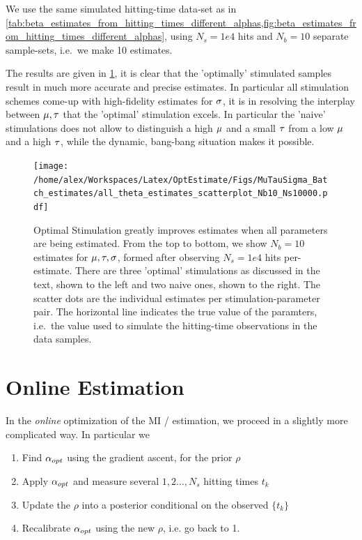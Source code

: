 We use the same simulated hitting-time data-set as in
\cref{tab:beta_estimates_from_hitting_times_different_alphas,fig:beta_estimates_from_hitting_times_different_alphas},
using $N_s=1e4$ hits and $N_b=10$ separate sample-sets, i.e.\ we make 10
estimates.

The results are given in \cref{fig:all_theta_estimates_batch}, it is clear that
the 'optimally' stimulated samples result in much more accurate and precise
estimates. In particular all stimulation schemes come-up with high-fidelity
estimates for $\sigma$, it is in resolving the interplay between ${\mu },{ \tau }$ that the
'optimal' stimulation excels. In particular the 'naive' stimulations does
not allow to distinguish a high ${\mu }$ and a small ${ \tau }$ from a low ${\mu }$
and a high ${ \tau }$, while the dynamic, bang-bang situation makes it possible.

\begin{figure}[htp]
\begin{center}
  \texttt{[image: /home/alex/Workspaces/Latex/OptEstimate/Figs/MuTauSigma\_Batch\_estimates/all\_theta\_estimates\_scatterplot\_Nb10\_Ns10000.pdf]}
  \caption[Batch estimates for all 3 parameters]{Optimal Stimulation greatly
  improves estimates when all parameters are being estimated. 
  From the top to bottom, we show $N_b=10$ estimates for ${\mu },{ \tau },\sigma$,
  formed after observing $N_s=1e4$ hits per-estimate. There are three 'optimal'
  stimulations as discussed in the text, shown to the left and two naive ones,
  shown to the right. The scatter dots are the individual estimates per
  stimulation-parameter pair. The horizontal line indicates the true value of
  the paramters, i.e.\ the value used to simulate the hitting-time observations
  in the data samples.}
  \label{fig:all_theta_estimates_batch}
\end{center}
\end{figure}

\clearpage

\section{Online Estimation}
\label{sec:online_estimation} 
In the {\sl online} optimization of the MI / estimation, we proceed in a
slightly more complicated way. In particular we 

\begin{enumerate}
  \item Find ${\alpha_{opt} }$ using the gradient ascent, for the prior $\rho$
  \item Apply ${\alpha_{opt} }$ and measure several $1,2\ldots,N_{s}$ hitting times
  $t_k$
  \item Update the $\rho$ into a posterior conditional on the observed $\{t_k\}$
  \item Recalibrate ${\alpha_{opt} }$ using the new $\rho$, i.e. go back to 1. 
\end{enumerate}

